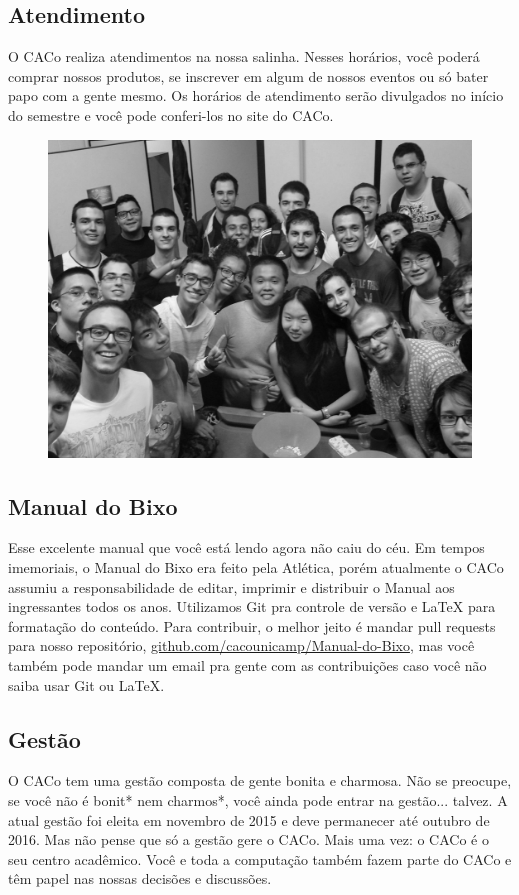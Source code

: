 \subsection{Atendimento}

O CACo realiza atendimentos na nossa salinha. Nesses horários, você poderá
comprar nossos produtos, se inscrever em algum de nossos eventos ou só bater
papo com a gente mesmo. Os horários de atendimento serão divulgados no início do
semestre e você pode conferi-los no site do CACo.

\begin{figure}[H]
    \centering
    \includegraphics[width=.45\textwidth]{img/alem_da_graduacao/caco_salinha.jpg}
\end{figure}

\subsection{Manual do Bixo}

Esse excelente manual que você está lendo agora não caiu do céu. Em tempos
imemoriais, o Manual do Bixo era feito pela Atlética, porém atualmente o CACo
assumiu a responsabilidade de editar, imprimir e distribuir o Manual aos
ingressantes todos os anos. Utilizamos Git pra controle de versão e {\LaTeX }
para formatação do conteúdo. Para contribuir, o melhor jeito é mandar pull
requests para nosso repositório, \url{github.com/cacounicamp/Manual-do-Bixo},
mas você também pode mandar um email pra gente com as contribuições caso você
não saiba usar Git ou \LaTeX.

\subsection{Gestão}

O CACo tem uma gestão composta de gente bonita e charmosa. Não se preocupe, se
você não é bonit* nem charmos*, você ainda pode entrar na gestão... talvez. A
atual gestão foi eleita em novembro de 2015 e deve permanecer até outubro de
2016. Mas não pense que só a gestão gere o CACo. Mais uma vez: o CACo é o seu
centro acadêmico. Você e toda a computação também fazem parte do CACo e têm
papel nas nossas decisões e discussões.

